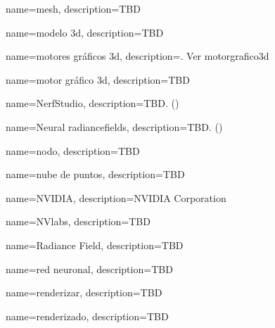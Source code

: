 



{
    name={mesh},
    description={TBD}
}

{
    name={modelo \acrshort{3d}},
    description={TBD}
}

{
    name={motores gráficos \acrshort{3d}},
    description={. Ver \gls{motorgrafico3d}}
}

{
    name={motor gráfico \acrshort{3d}},
    description={TBD}
}


{
    name={NerfStudio},
    description={TBD. (\cite{nerfstudio})}
}

{
    name={Neural \glspl{radiancefield}},
    description={TBD. (\cite{mildenhall2020nerf})}
}

{
    name={nodo},
    description={TBD}
}

{
    name={nube de puntos},
    description={TBD}
}

{
    name={NVIDIA},
    description={NVIDIA Corporation}
}

{
    name={NVlabs},
    description={TBD}
}





{
    name={Radiance Field},
    description={TBD}
}

{
    name={red neuronal},
    description={TBD}
}

{
    name={renderizar},
    description={TBD}
}

{
    name={renderizado},
    description={TBD}
}

